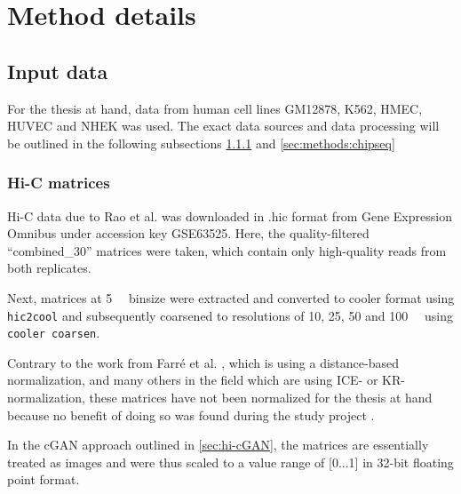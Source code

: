 \section{Method details}
\subsection{Input data}
For the thesis at hand, data from human cell lines GM12878, K562, HMEC, HUVEC and NHEK was used.
The exact data sources and data processing will be outlined in the following subsections \ref{sec:methods:hicMatrices} and \ref{sec:methods:chipseq}


\subsubsection{Hi-C matrices} \label{sec:methods:hicMatrices}
Hi-C data due to Rao et al. \cite{Rao2014} was downloaded 
in .hic format from Gene Expression Omnibus under accession key GSE63525.
Here, the quality-filtered ``combined\_30'' matrices were taken, which contain only high-quality reads from 
both replicates.

Next, matrices at \SI{5}{\kilo\bp} binsize were extracted and converted to cooler format using \texttt{hic2cool}
and subsequently coarsened to resolutions of 10, 25, 50 and \SI{100}{\kilo\bp} using \texttt{cooler coarsen}.

Contrary to the work from Farr\'e et al. \cite{Farre2018a}, which is using a distance-based normalization,
and many others in the field which are using ICE- or KR-normalization, 
these matrices have not been normalized for the thesis at hand
because no benefit of doing so was found during the study project \cite{Krauth2020}.

In the cGAN approach outlined in \cref{sec:hi-cGAN}, the matrices are essentially treated as images and were
thus scaled to a value range of [0...1] in 32-bit floating point format.

